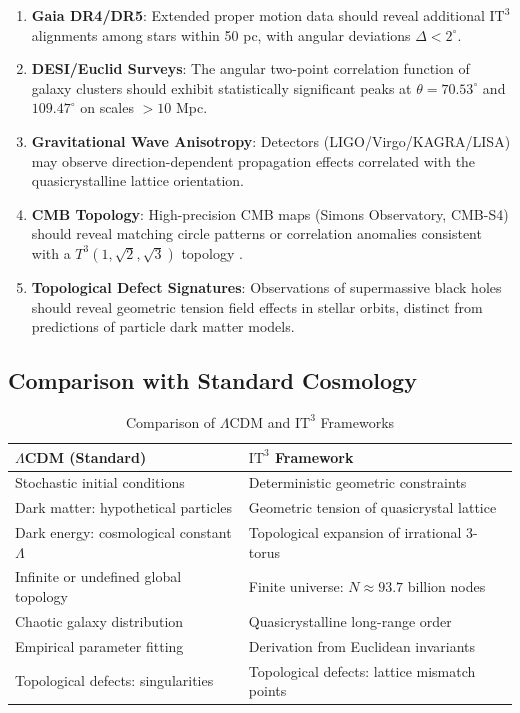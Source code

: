 \documentclass[12pt,a4paper,oneside]{article}
\newcommand{\ITthree}{\text{IT}^3}
\begin{document}
\begin{enumerate}
    \item \textbf{Gaia DR4/DR5}: Extended proper motion data should reveal additional $\ITthree$ alignments among stars within 50 pc, with angular deviations $\Delta < 2^\circ$.
    
    \item \textbf{DESI/Euclid Surveys}: The angular two-point correlation function of galaxy clusters should exhibit statistically significant peaks at $\theta = 70.53^\circ$ and $109.47^\circ$ on scales $> 10$ Mpc.
    
    \item \textbf{Gravitational Wave Anisotropy}: Detectors (LIGO/Virgo/KAGRA/LISA) may observe direction-dependent propagation effects correlated with the quasicrystalline lattice orientation.
    
    \item \textbf{CMB Topology}: High-precision CMB maps (Simons Observatory, CMB-S4) should reveal matching circle patterns or correlation anomalies consistent with a $T^3(1,\sqrt{2},\sqrt{3})$ topology \cite{Weeks2002, Luminet2003}.
    
    \item \textbf{Topological Defect Signatures}: Observations of supermassive black holes should reveal geometric tension field effects in stellar orbits, distinct from predictions of particle dark matter models.
\end{enumerate}

\subsection{Comparison with Standard Cosmology}

\begin{table}[htbp]
\centering
\caption{Comparison of $\Lambda$CDM and $\ITthree$ Frameworks}
\label{tab:comparison}
\begin{tabular}{p{} p{}}
\toprule
\textbf{$\Lambda$CDM (Standard)} & \textbf{$\ITthree$ Framework} \\
\midrule
Stochastic initial conditions & Deterministic geometric constraints \\
Dark matter: hypothetical particles & Geometric tension of quasicrystal lattice \\
Dark energy: cosmological constant $\Lambda$ & Topological expansion of irrational 3-torus \\
Infinite or undefined global topology & Finite universe: $N \approx 93.7$ billion nodes \\
Chaotic galaxy distribution & Quasicrystalline long-range order \\
Empirical parameter fitting & Derivation from Euclidean invariants \\
Topological defects: singularities & Topological defects: lattice mismatch points \\
\bottomrule
\end{tabular}
\end{table}
\end{document}
